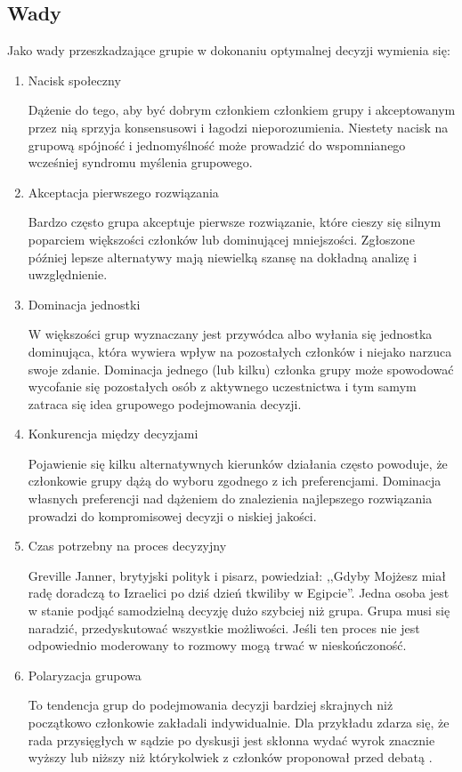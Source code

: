 \subsection{Wady}
Jako wady przeszkadzające grupie w dokonaniu optymalnej decyzji wymienia się:
\begin{enumerate}
  \item Nacisk społeczny
  
  Dążenie do tego, aby być dobrym członkiem członkiem grupy i akceptowanym przez
  nią sprzyja konsensusowi i łagodzi nieporozumienia. Niestety nacisk na grupową
  spójność i jednomyślność może prowadzić do wspomnianego wcześniej syndromu
  myślenia grupowego.
  
  \item Akceptacja pierwszego rozwiązania
  
  Bardzo często grupa akceptuje pierwsze rozwiązanie, które cieszy się silnym
  poparciem większości członków lub dominującej mniejszości. Zgłoszone później
  lepsze alternatywy mają niewielką szansę na dokładną analizę i uwzględnienie.
  
  \item Dominacja jednostki
  
  W większości grup wyznaczany jest przywódca albo wyłania się jednostka
  dominująca, która wywiera wpływ na pozostałych członków i niejako narzuca
  swoje zdanie. Dominacja jednego (lub kilku) członka grupy może spowodować
  wycofanie się pozostałych osób z aktywnego uczestnictwa i tym samym zatraca
  się idea grupowego podejmowania decyzji.
  
  \item Konkurencja między decyzjami
  
  Pojawienie się kilku alternatywnych kierunków działania często powoduje, że
  członkowie grupy dążą do wyboru zgodnego z ich preferencjami. Dominacja
  własnych preferencji nad dążeniem do znalezienia najlepszego rozwiązania
  prowadzi do kompromisowej decyzji o niskiej jakości.
  
  \item Czas potrzebny na proces decyzyjny
  
  Greville Janner, brytyjski polityk i pisarz, powiedział: ,,Gdyby Mojżesz miał
  radę doradczą to Izraelici po dziś dzień tkwiliby w Egipcie''. Jedna osoba
  jest w stanie podjąć samodzielną decyzję dużo szybciej niż grupa. Grupa musi
  się naradzić, przedyskutować wszystkie możliwości. Jeśli ten proces nie jest
  odpowiednio moderowany to rozmowy mogą trwać w nieskończoność.

  \item Polaryzacja grupowa
  
  To tendencja grup do podejmowania decyzji bardziej skrajnych niż początkowo
  członkowie zakładali indywidualnie. Dla przykładu zdarza się, że rada
  przysięgłych w sądzie po dyskusji jest skłonna wydać wyrok znacznie wyższy lub
  niższy niż którykolwiek z członków proponował przed debatą
  \cite{Supernat2005}.

\end{enumerate}

